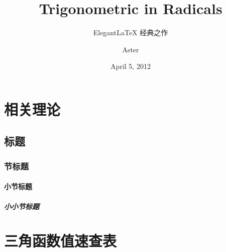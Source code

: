 \documentclass[lang=cn,10pt]{elegantbook}
\title{Trigonometric in Radicals}
\subtitle{Elegant\LaTeX{} 经典之作}
\author{Aster}
\date{April 5, 2012}
\begin{document}
\maketitle
\frontmatter

\tableofcontents

\mainmatter

\part{相关理论}\label{part:introduce}

\chapter{标题}
\section{节标题}
\subsection{小节标题}
\subsubsection{小小节标题}

\part{三角函数值速查表}\label{part:trig}
\setcounter{chapter}{0}





\end{document}
